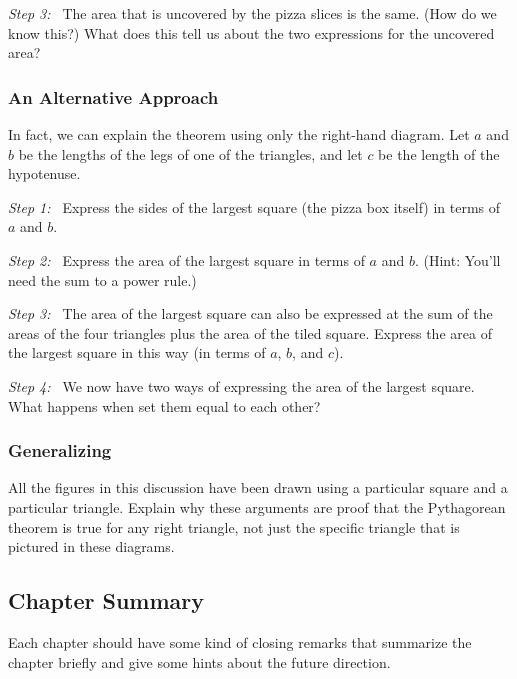 \textit{Step 3:~} The area that is uncovered by the pizza slices is the same. (How do we know this?) What does this tell us about the two expressions for the uncovered area?

\subsubsection{An Alternative Approach}

In fact, we can explain the theorem using only the right-hand diagram. Let $a$ and $b$ be the lengths of the legs of one of the triangles, and let $c$ be the length of the hypotenuse.

\begin{center}
\end{center}

\textit{Step 1:~} Express the sides of the largest square (the pizza box itself) in terms of $a$ and $b$.

\textit{Step 2:~} Express the area of the largest square in terms of $a$ and $b$. (Hint: You'll need the sum to a power rule.)

\textit{Step 3:~} The area of the largest square can also be expressed at the sum of the areas of the four triangles plus the area of the tiled square. Express the area of the largest square in this way (in terms of $a$, $b$, and $c$).

\textit{Step 4:~} We now have two ways of expressing the area of the largest square. What happens when set them equal to each other?

\subsubsection{Generalizing}

All the figures in this discussion have been drawn using a particular square and a particular triangle. Explain why these arguments are proof that the Pythagorean theorem is true for any right triangle, not just the specific triangle that is pictured in these diagrams.


\subsection*{Chapter Summary}

Each chapter should have some kind of closing remarks that summarize the chapter briefly and give some hints about the future direction.
